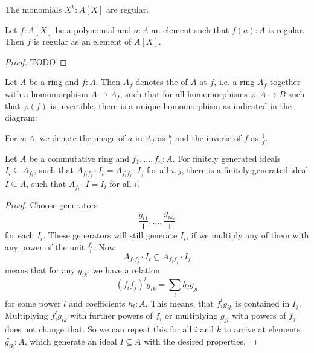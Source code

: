 \begin{example}
  The monomials $X^k:A[X]$ are regular.
\end{example}

\begin{lemma}%
  \label{polynomial-with-regular-value-is-regular}
  Let $f : A[X]$ be a polynomial
  and $a : A$ an element
  such that $f(a) : A$ is regular.
  Then $f$ is regular as an element of $A[X]$.
\end{lemma}

\begin{proof}
  TODO
\end{proof}

\begin{definition}
  Let $A$ be a ring and $f:A$.
  Then $A_{f}$ denotes the  of $A$ at $f$,
  i.e. a ring $A_f$ together with a homomorphism $A\to A_f$,
  such that for all homomorphisms $\varphi:A\to B$ such that
  $\varphi(f)$ is invertible, there is a unique homomorphism as indicated in the diagram:
  \begin{center}
  \end{center}
  For $a:A$, we denote the image of $a$ in $A_f$ as $\frac{a}{1}$ and the inverse of $f$ as $\frac{1}{f}$.
\end{definition}

\begin{lemma}%
  \label{fg-ideal-local-global}
  Let $A$ be a commutative ring and $f_1,\dots,f_n:A$.
  For finitely generated ideals $I_i\subseteq A_{f_i}$,
  such that $A_{f_if_j}\cdot I_i=A_{f_if_j}\cdot I_j$ for all $i,j$,
  there is a finitely generated ideal $I\subseteq A$,
  such that $A_{f_i}\cdot I=I_i$ for all $i$.
\end{lemma}

\begin{proof}
  Choose generators 
  \[ \frac{g_{i1}}{1},\dots,\frac{g_{ik_i}}{1} \]
  for each $I_i$.
  These generators will still generate $I_i$, if we multiply any of them with any power of the unit $\frac{f_i}{1}$.
  Now
  \[ A_{f_if_j}\cdot I_i\subseteq A_{f_if_j}\cdot I_j \]
  means that for any $g_{ik}$, we have a relation
  \[ (f_if_j)^l g_{ik}=\sum_{l}h_{l}g_{jl}\]
  for some power $l$ and coefficients $h_{l}:A$.
  This means, that $f_i^lg_{ik}$ is contained in $I_j$.
  Multiplying $f_i^lg_{ik}$ with further powers of $f_i$ or multiplying $g_{jl}$ with powers of $f_j$ does not change that.
  So we can repeat this for all $i$ and $k$ to arrive at elements $\tilde{g_{ik}}:A$,
  which generate an ideal $I\subseteq A$ with the desired properties.
\end{proof}

